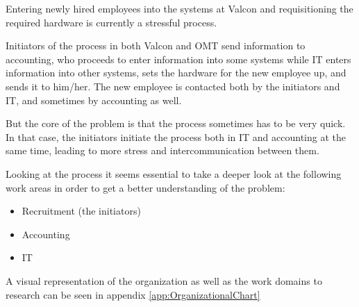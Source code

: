 Entering newly hired employees into the systems at Valcon and requisitioning the required hardware is currently a stressful process.

Initiators of the process in both Valcon and OMT send information to accounting, who proceeds to enter information into some systems while IT enters information into other systems, sets the hardware for the new employee up, and sends it to him/her.
The new employee is contacted both by the initiators and IT, and sometimes by accounting as well.

But the core of the problem is that the process sometimes has to be very quick.
In that case, the initiators initiate the process both in IT and accounting at the same time, leading to more stress and intercommunication between them.

Looking at the process it seems essential to take a deeper look at the following work areas in order to get a better understanding of the problem:
\begin{itemize}
\item Recruitment (the initiators)
\item Accounting
\item IT
\end{itemize}

A visual representation of the organization as well as the work domains to research can be seen in appendix \ref{app:OrganizationalChart}